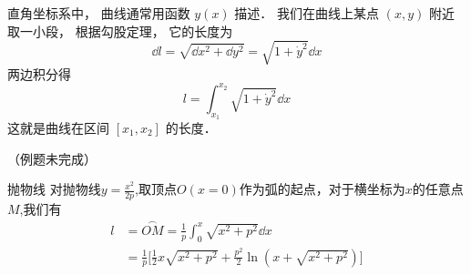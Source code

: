

直角坐标系中， 曲线通常用函数 $y(x)$ 描述． 我们在曲线上某点 $(x, y)$ 附近取一小段， 根据勾股定理， 它的长度为
\begin{equation}
\dd{l} = \sqrt{\dd{x}^2 + \dd{y}^2} = \sqrt{1 + \dot y^2} \dd{x}
\end{equation}
两边积分得
\begin{equation}\label{CurLen_eq1}
l = \int_{x_1}^{x_2} \sqrt{1 + \dot y^2} \dd{x}
\end{equation}
这就是曲线在区间 $[x_1, x_2]$ 的长度．

（例题未完成）
\begin{example}{抛物线}
对抛物线$y=\frac{x^2}{2p}$,取顶点$O(x=0)$作为弧的起点，对于横坐标为$x$的任意点$M$,我们有
\begin{equation}
\begin{aligned}
l&=\overset{\frown}{OM}=\frac{1}{p}\int_{0}^{x}\sqrt{x^2+p^2}\dd{x}\\
&=\frac{1}{p}\Bigg[\frac{1}{2}x\sqrt{x^2+p^2}+\frac{p^2}{2}\ln(x+\sqrt{x^2+p^2})\Bigg]
\end{aligned}
\end{equation}

\end{example}
